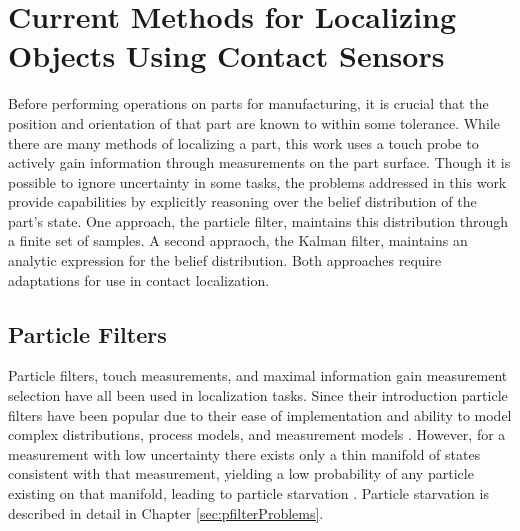\documentclass[../thesis.tex]{subfiles}
\begin{document}
\section{Current Methods for Localizing Objects Using Contact Sensors}

Before performing operations on parts for manufacturing, it is crucial that the position and orientation of that part are known to within some tolerance.
While there are many methods of localizing a part, this work uses a touch probe to actively gain information through measurements on the part surface.
Though it is possible to ignore uncertainty in some tasks, the problems addressed in this work provide capabilities by explicitly reasoning over the belief distribution of the part's state.
One approach, the particle filter, maintains this distribution through a finite set of samples.
A second appraoch, the Kalman filter, maintains an analytic expression for the belief distribution.
Both approaches require adaptations for use in contact localization.





\subsection{Particle Filters}
Particle filters, touch measurements, and maximal information gain measurement selection have all been used in localization tasks. 
Since their introduction particle filters have been popular due to their ease of implementation and ability to model complex distributions, process models, and measurement models \cite{Thrun2000a}. 
However, for a measurement with low uncertainty there exists only a thin manifold of states consistent with that measurement, yielding a low probability of any particle existing on that manifold, leading to particle starvation \cite{Thrun2000}.
Particle starvation is described in detail in Chapter \ref{sec:pfilterProblems}.
\end{document}
